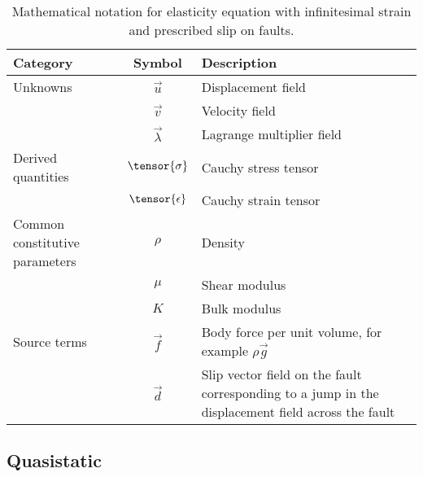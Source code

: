 \begin{table}[htbp]
  \caption{Mathematical notation for elasticity equation with
    infinitesimal strain and prescribed slip on faults.}
  \label{tab:notation:elasticity:prescribed:slip}
  \begin{tabular}{lcp{3in}}
    \toprule
    {\bf Category} & {\bf Symbol} & {\bf Description} \\
    \midrule
    Unknowns & $\vec{u}$ & Displacement field \\
    & $\vec{v}$ & Velocity field \\
    & $\vec{\lambda}$ & Lagrange multiplier field \\
    Derived quantities & $\tensor{\sigma}$ & Cauchy stress tensor \\
                   & $\tensor{\epsilon}$ & Cauchy strain tensor \\
    Common constitutive parameters & $\rho$ & Density \\
  & $\mu$ & Shear modulus \\
  & $K$ & Bulk modulus \\
Source terms & $\vec{f}$ & Body force per unit volume, for example $\rho \vec{g}$ \\
    & $\vec{d}$ & Slip vector field on the fault corresponding to a
      jump in the displacement field across the fault \\
    \bottomrule
  \end{tabular}
\end{table}

\subsection{Quasistatic}


